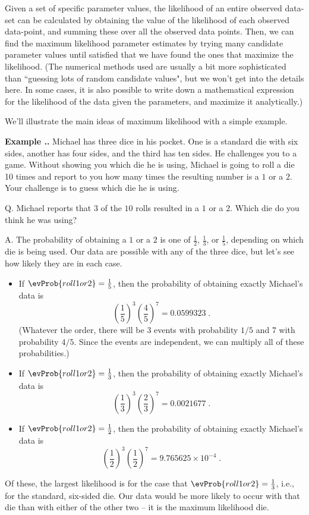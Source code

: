 \documentclass[twoside]{book}\usepackage[]{graphicx}\usepackage[]{xcolor}
\def\myindex#1{\index{#1}}
\def\question{{\sf Q. }}
\def\answer{{\sf A. }}
\newcounter{example}[section]
\newenvironment{example}%
{\refstepcounter{example}%
\textbf{Example \thesection.\arabic{example}. }}%
{}
\begin{document}
Given a set of specific parameter values, the likelihood of an entire observed data-set can be calculated by obtaining the value of the likelihood of each observed data-point, and summing these over all the observed data points.  Then, we can find the maximum likelihood parameter estimates by trying many candidate parameter values until satisfied that we have found the ones that maximize the likelihood. (The numerical methods used are usually a bit more sophisticated than ``guessing lots of random candidate values", but we won't get into the details here. In some cases, it is also possible to write down a mathematical expression for the likelihood of the data given the parameters, and maximize it analytically.)

We'll illustrate the main ideas of maximum likelihood with a simple example.

\begin{example}
\myindex{dice|exampleidx}%
Michael has three dice in his pocket.  One is a standard die with six sides,
another has four sides, and the third has ten sides.  He challenges you to a
game.  Without showing you which die he is using, Michael is going to roll a 
die 10 times and report to you how many times the resulting number is a 
$1$ or a $2$.  Your challenge is to guess which die he is using.

\question Michael reports that $3$ of the $10$ rolls resulted in a $1$ or a
$2$.  Which die do you think he was using?

\answer
The probability of obtaining a $1$ or a $2$ is one of $\frac12$,
$\frac13$, or $\frac15$, depending on which die is being used.  Our data
are possible with any of the three dice, but let's see how likely they are
in each case.

\begin{itemize}
\item
If $\evProb{roll 1 or 2}  = \frac15$, 
then the probability of obtaining exactly Michael's data is 
\[
\left(\frac15\right)^3 \left(\frac45\right)^7  
=  0.0599323
\;.
\]
(Whatever the order, there will be 3 events with probability
$1/5$ and 7 with probability $4/5$.  Since the events are independent,
we can multiply all of these probabilities.)
\item
If $\evProb{roll 1 or 2}  = \frac13$, 
then the probability of obtaining exactly Michael's data is 
\[
\left(\frac13\right)^3 \left(\frac23\right)^7 
=  0.0021677
\;.
\]
\item
If $\evProb{roll 1 or 2}  = \frac12$, 
then the probability of obtaining exactly Michael's data is 
\[
\left(\frac12\right)^3 \left(\frac12\right)^7 = \ensuremath{9.765625\times 10^{-4}}
\;.
\]
\end{itemize}
Of these, the largest likelihood is for the case that 
$\evProb{roll 1 or 2}  = \frac13$, i.e.,
for the standard, six-sided die.  Our data would be more likely
to occur with that die than with either of the other two -- it is the 
maximum likelihood die.
\end{example}
\end{document}
